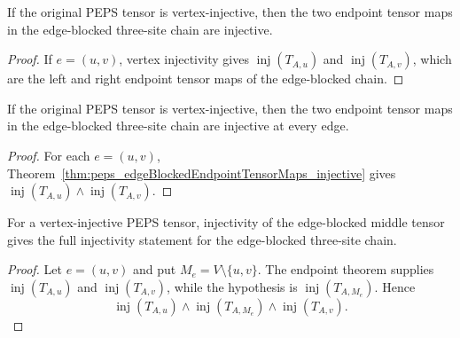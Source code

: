 \begin{theorem}%
    \label{thm:peps_edgeBlockedEndpointTensorMaps_injective}
    \leanok
    If the original PEPS tensor is vertex-injective, then the two endpoint
    tensor maps in the edge-blocked three-site chain are injective.
\end{theorem}
\begin{proof}\leanok
    If $e=(u,v)$, vertex injectivity gives
    $\operatorname{inj}(T_{A,u})$ and $\operatorname{inj}(T_{A,v})$, which are
    the left and right endpoint tensor maps of the edge-blocked chain.
\end{proof}

\begin{theorem}%
    \label{thm:peps_edgeBlockedEndpointTensorMaps_injective_all}
    \leanok
    If the original PEPS tensor is vertex-injective, then the two endpoint
    tensor maps in the edge-blocked three-site chain are injective at every
    edge.
\end{theorem}
\begin{proof}\leanok
    For each $e=(u,v)$, Theorem~\ref{thm:peps_edgeBlockedEndpointTensorMaps_injective}
    gives
    $\operatorname{inj}(T_{A,u})\wedge\operatorname{inj}(T_{A,v})$.
\end{proof}

\begin{theorem}%
    \label{thm:peps_edgeBlockedThreeSiteInjective_of_middle}
    \leanok
    For a vertex-injective PEPS tensor, injectivity of the edge-blocked middle
    tensor gives the full injectivity statement for the edge-blocked three-site
    chain.
\end{theorem}
\begin{proof}\leanok
    Let $e=(u,v)$ and put $M_e=V\setminus\{u,v\}$. The endpoint theorem supplies
    $\operatorname{inj}(T_{A,u})$ and $\operatorname{inj}(T_{A,v})$, while the
    hypothesis is $\operatorname{inj}(T_{A,M_e})$. Hence
    \[
        \operatorname{inj}(T_{A,u})
        \wedge \operatorname{inj}(T_{A,M_e})
        \wedge \operatorname{inj}(T_{A,v}).
    \]
\end{proof}

